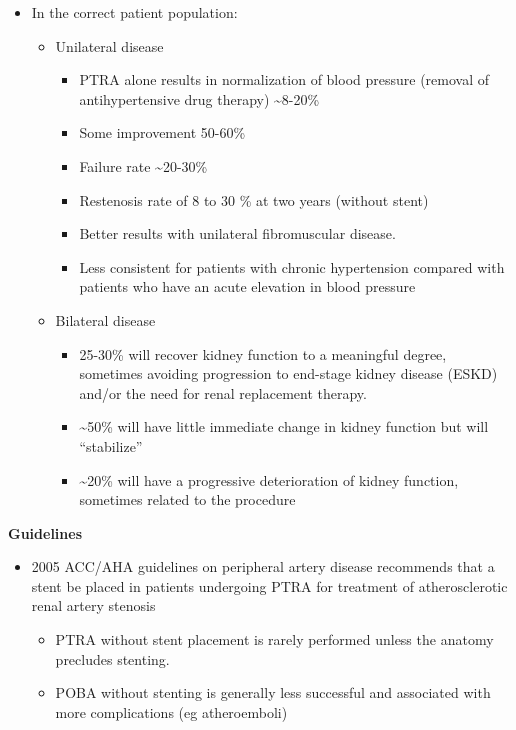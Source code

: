 \documentclass[
]{book}
\begin{document}
\begin{itemize}
\item
  In the correct patient population:

  \begin{itemize}
  \item
    Unilateral disease

    \begin{itemize}
    \item
      PTRA alone results in normalization of blood pressure
      (removal of antihypertensive drug therapy) \textasciitilde8-20\%
    \item
      Some improvement 50-60\%
    \item
      Failure rate \textasciitilde20-30\%
    \item
      Restenosis rate of 8 to 30 \% at two years (without stent)
    \item
      Better results with unilateral fibromuscular disease.
    \item
      Less consistent for patients with chronic hypertension
      compared with patients who have an acute elevation in blood
      pressure
    \end{itemize}
  \item
    Bilateral disease

    \begin{itemize}
    \item
      25-30\% will recover kidney function to a meaningful degree,
      sometimes avoiding progression to end-stage kidney disease
      (ESKD) and/or the need for renal replacement therapy.
    \item
      \textasciitilde50\% will have little immediate change in kidney function
      but will ``stabilize''
    \item
      \textasciitilde20\% will have a progressive deterioration of kidney
      function, sometimes related to the procedure
    \end{itemize}
  \end{itemize}
\end{itemize}

\textbf{Guidelines}

\begin{itemize}
\item
  2005 ACC/AHA guidelines on peripheral artery disease recommends that
  a stent be placed in patients undergoing PTRA for treatment of
  atherosclerotic renal artery stenosis \citep{hirschACCAHA20052006}

  \begin{itemize}
  \item
    PTRA without stent placement is rarely performed unless the
    anatomy precludes stenting.
  \item
    POBA without stenting is generally less successful and
    associated with more complications (eg atheroemboli)
  \end{itemize}
\end{itemize}
\end{document}
